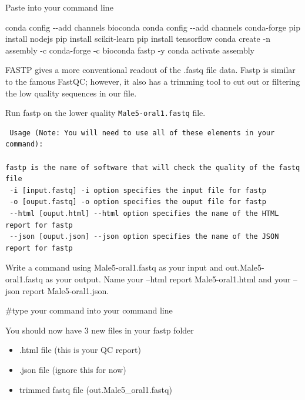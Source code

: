 \documentclass[
]{article}
\newenvironment{Shaded}{\begin{snugshade}}{\end{snugshade}}
\newcommand{\AttributeTok}[1]{\textcolor[rgb]{0.77,0.63,0.00}{#1}}
\newcommand{\ExtensionTok}[1]{#1}
\newcommand{\NormalTok}[1]{#1}
\providecommand{\tightlist}{%
  \setlength{\itemsep}{0pt}\setlength{\parskip}{0pt}}
\begin{document}
Paste into your command line

\begin{Shaded}
\begin{Highlighting}[]
\ExtensionTok{conda}\NormalTok{ config }\AttributeTok{{-}{-}add}\NormalTok{ channels bioconda}
\ExtensionTok{conda}\NormalTok{ config }\AttributeTok{{-}{-}add}\NormalTok{ channels conda{-}forge}
\ExtensionTok{pip}\NormalTok{ install nodejs}
\ExtensionTok{pip}\NormalTok{ install scikit{-}learn}
\ExtensionTok{pip}\NormalTok{ install tensorflow}
\ExtensionTok{conda}\NormalTok{ create }\AttributeTok{{-}n}\NormalTok{ assembly }\AttributeTok{{-}c}\NormalTok{ conda{-}forge }\AttributeTok{{-}c}\NormalTok{ bioconda fastp }\AttributeTok{{-}y}
\ExtensionTok{conda}\NormalTok{ activate assembly}
\end{Highlighting}
\end{Shaded}

FASTP gives a more conventional readout of the .fastq file data. Fastp
is similar to the famous FastQC; however, it also has a trimming tool to
cut out or filtering the low quality sequences in our file.

Run fastp on the lower quality \texttt{Male5-oral1.fastq} file.

\begin{verbatim}
 Usage (Note: You will need to use all of these elements in your command):

fastp is the name of software that will check the quality of the fastq file
 -i [input.fastq] -i option specifies the input file for fastp
 -o [ouput.fastq] -o option specifies the ouput file for fastp
 --html [ouput.html] --html option specifies the name of the HTML report for fastp
 --json [ouput.json] --json option specifies the name of the JSON report for fastp
\end{verbatim}

Write a command using Male5-oral1.fastq as your input and
out.Male5-oral1.fastq as your output. Name your --html report
Male5-oral1.html and your --json report Male5-oral1.json.

\begin{Shaded}
\begin{Highlighting}[]
\NormalTok{\#type your command into your command line}
\end{Highlighting}
\end{Shaded}

You should now have 3 new files in your fastp folder

\begin{itemize}
\tightlist
\item
  .html file (this is your QC report)
\item
  .json file (ignore this for now)
\item
  trimmed fastq file (out.Male5\_oral1.fastq)
\end{itemize}
\end{document}

